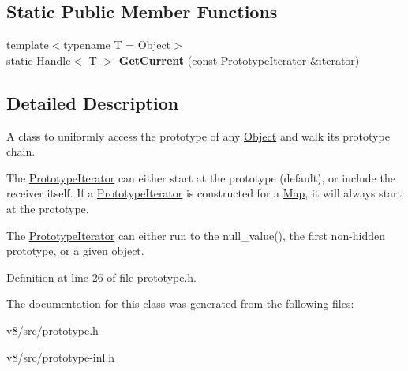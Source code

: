 \subsection*{Static Public Member Functions}
\begin{DoxyCompactItemize}
\item 
\mbox{\label{classv8_1_1internal_1_1PrototypeIterator_a2dad7933aebf24bafd3c8d5db1271824}} 
{\footnotesize template$<$typename T  = Object$>$ }\\static \mbox{\hyperlink{classv8_1_1internal_1_1Handle}{Handle}}$<$ \mbox{\hyperlink{classv8_1_1internal_1_1torque_1_1T}{T}} $>$ {\bfseries Get\+Current} (const \mbox{\hyperlink{classv8_1_1internal_1_1PrototypeIterator}{Prototype\+Iterator}} \&iterator)
\end{DoxyCompactItemize}


\subsection{Detailed Description}
A class to uniformly access the prototype of any \mbox{\hyperlink{classv8_1_1internal_1_1Object}{Object}} and walk its prototype chain.

The \mbox{\hyperlink{classv8_1_1internal_1_1PrototypeIterator}{Prototype\+Iterator}} can either start at the prototype (default), or include the receiver itself. If a \mbox{\hyperlink{classv8_1_1internal_1_1PrototypeIterator}{Prototype\+Iterator}} is constructed for a \mbox{\hyperlink{classv8_1_1internal_1_1Map}{Map}}, it will always start at the prototype.

The \mbox{\hyperlink{classv8_1_1internal_1_1PrototypeIterator}{Prototype\+Iterator}} can either run to the null\+\_\+value(), the first non-\/hidden prototype, or a given object. 

Definition at line 26 of file prototype.\+h.



The documentation for this class was generated from the following files\+:\begin{DoxyCompactItemize}
\item 
v8/src/prototype.\+h\item 
v8/src/prototype-\/inl.\+h\end{DoxyCompactItemize}
